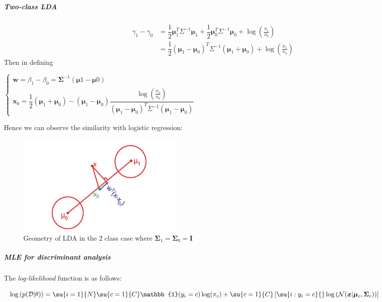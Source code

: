 \subparagraph{Two-class LDA}
\begin{align*}
    \gamma_{1} - \gamma_{0} 
    &= \dfrac{1}{2}\bm{\mu}_{1}^{T}\Sigma^{-1}\bm{\mu}_{1}+
    \dfrac{1}{2}\bm{\mu}_{0}^{T}\Sigma^{-1}\bm{\mu}_{0} +
    \log\left(\frac{\pi_{1}}{\pi_{0}}\right)\\
    &= \dfrac{1}{2}\left(\bm{\mu}_{1} - \bm{\mu}_{0}\right)^{T}\Sigma^{-1}
    \left(\bm{\mu}_{1} + \bm{\mu}_{0}\right) + \log\left(\frac{\pi_{1}}{\pi_{0}}\right)
\end{align*}
Then in defining 
\begin{center}
    $\begin{cases}
        \bm{w} = \beta_{1} - \beta_{0} = \bm{\Sigma}^{-1}\left(\bm{\mu}{1}-\bm{\mu}{0}
        \right)\\
        \bm{x}_{0} = \dfrac{1}{2}\left(\bm{\mu}_{1} + \bm{\mu}_{0}\right) - 
        \left(\bm{\mu}_{1} - \bm{\mu}_{0}\right)\dfrac{\log\left(\frac{\pi_{1}}{\pi_{0}}
        \right)}{\left(\bm{\mu}_{1} - \bm{\mu}_{0}\right)^{T}\Sigma^{-1}
    \left(\bm{\mu}_{1} - \bm{\mu}_{0}\right)}
    \end{cases}$
\end{center}
Hence we can observe the similarity with logistic regression:
\begin{center}
\end{center}
\begin{figure}[H]
    \begin{center}
        \includegraphics[width=.5\textwidth]{./chaps/32_sec/images/2_geometry_lda.png}
    \end{center}
    \caption{Geometry of LDA in the 2 class case where $\bm{\Sigma}_{1} = \bm{\Sigma}_{0}
= \bm{I}$}
    \label{fig:2_geometry_lda}
\end{figure}

\subparagraph{MLE for discriminant analysis}
The \emph{log-likelihood} function is as follows:
\begin{center}
    $\log\left(p(\mathcal{D}|\theta)\right) = 
    \su{i=1}{N}\su{c=1}{C}\mathbb{1}(y_{i}=c)\log(\pi_{c}) + \su{c=1}{C}\left[
        \su{i:y_{i}=c}{}\log\left(\mathcal{N}(\bm{x}|\bm{\mu}_{c},\bm{\Sigma}_{c})\right)
\right]$
\end{center}





